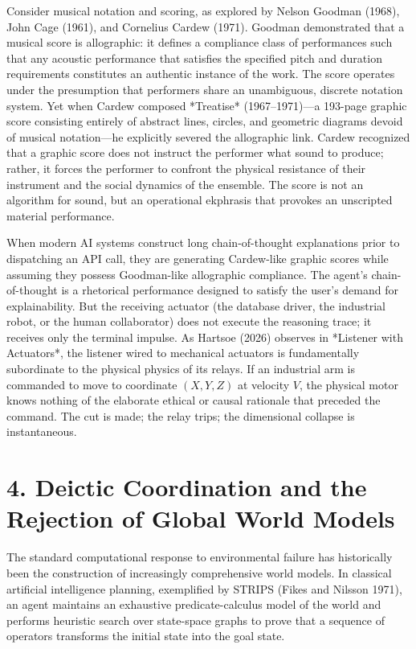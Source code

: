 \documentclass[11pt,twocolumn]{article}
\begin{document}
Consider musical notation and scoring, as explored by Nelson Goodman (1968), John Cage (1961), and Cornelius Cardew (1971). Goodman demonstrated that a musical score is allographic: it defines a compliance class of performances such that any acoustic performance that satisfies the specified pitch and duration requirements constitutes an authentic instance of the work. The score operates under the presumption that performers share an unambiguous, discrete notation system. Yet when Cardew composed *Treatise* (1967–1971)—a 193-page graphic score consisting entirely of abstract lines, circles, and geometric diagrams devoid of musical notation—he explicitly severed the allographic link. Cardew recognized that a graphic score does not instruct the performer what sound to produce; rather, it forces the performer to confront the physical resistance of their instrument and the social dynamics of the ensemble. The score is not an algorithm for sound, but an operational ekphrasis that provokes an unscripted material performance.

When modern AI systems construct long chain-of-thought explanations prior to dispatching an API call, they are generating Cardew-like graphic scores while assuming they possess Goodman-like allographic compliance. The agent's chain-of-thought is a rhetorical performance designed to satisfy the user's demand for explainability. But the receiving actuator (the database driver, the industrial robot, or the human collaborator) does not execute the reasoning trace; it receives only the terminal impulse. As Hartsoe (2026) observes in *Listener with Actuators*, the listener wired to mechanical actuators is fundamentally subordinate to the physical physics of its relays. If an industrial arm is commanded to move to coordinate $(X, Y, Z)$ at velocity $V$, the physical motor knows nothing of the elaborate ethical or causal rationale that preceded the command. The cut is made; the relay trips; the dimensional collapse is instantaneous.

\section*{4. Deictic Coordination and the Rejection of Global World Models}
The standard computational response to environmental failure has historically been the construction of increasingly comprehensive world models. In classical artificial intelligence planning, exemplified by STRIPS (Fikes and Nilsson 1971), an agent maintains an exhaustive predicate-calculus model of the world and performs heuristic search over state-space graphs to prove that a sequence of operators transforms the initial state into the goal state. 
\end{document}
